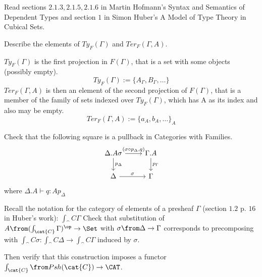 \def\pathToRoot{../../}



\author{Nikita Ziuzin}

\begin{hint}
  Read sections $2.1.3, 2.1.5, 2.1.6$ in Martin Hofmann's Syntax and Semantics
  of Dependent Types and section $1$ in Simon Huber's A Model of Type Theory in
  Cubical Sets.
\end{hint}

\begin{exercise}
  Describe the elements of $Ty_F(\Gamma)$ and $Ter_F(\Gamma, A)$.
\end{exercise}
\begin{answer}
  $Ty_F(\Gamma)$ is the first projection in $F(\Gamma)$, that is a set with some
  objects (possibly empty).
  \[
    Ty_F(\Gamma) := \{A_\Gamma, B_\Gamma, \dots\}
  \]
  $Ter_F(\Gamma, A)$ is then an element of the second projection of $F(\Gamma)$,
  that is a member of the family of sets indexed over $Ty_F(\Gamma)$, which has
  A as its index and also may be empty.
  \[
    Ter_F(\Gamma, A) := \{a_A, b_A, \dots\}_A
  \]
\end{answer}

\begin{exercise}
  Check that the following square is a pullback in Categories with Families.
  \[
    \begin{tikzcd}
      \Delta.A\sigma \arrow{r}{(\sigma \circ p_\Delta, q)} \arrow{d}{p_\Delta} & \Gamma.A \arrow{d}{p_\Gamma}\\
      \Delta \arrow{r}{\sigma} & \Gamma
    \end{tikzcd}
  \]
  where $\Delta.A \vdash q : A p_\Delta$
\end{exercise}

\begin{exercise}
  Recall the notation for the category of elements of a presheaf $\Gamma$
  (section $1.2$ p. $16$ in Huber's work): $\int_\cat{C}\Gamma$ Check that
  substitution of $A\from (\int_\cat{C}\Gamma)^\op \to \Set$ with $\sigma \from
  \Delta \to \Gamma$ corresponds to precomposing with $\int_\cat{C} \sigma :
  \int_\cat{C} \Delta \to \int_\cat{C} \Gamma$ induced by $\sigma$.

  Then verify that this construction imposes a functor $\int_\cat{C} \from
  Psh(\cat{C}) \to \CAT$.
\end{exercise}
\begin{answer}
\end{answer}

